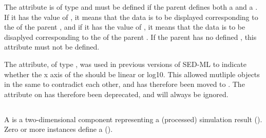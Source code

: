\begin{blockChanged}
The  attribute is of type  and must be defined if the parent \Plot defines both a  and a .  If it has the value of , it means that the data is to be displayed corresponding to the  of the parent \Plot, and if it has the value of , it means that the data is to be disaplyed corresponding to the  of the parent \Plot.  If the parent \Plot has no defined , this attribute must not be defined.

The  attribute, of type , was used in previous versions of SED-ML to indicate whether the x axis of the \Plot should be linear or log10.  This allowed mutliple \Curve objects in the same \Plot to contradict each other, and has therefore been moved to \Plot.  The  attribute on \Curve has therefore been deprecated, and will always be ignored.

\end{blockChanged}


\subsection{}
\label{class:curve}
A \Curve is a two-dimensional \Output component representing a (processed) simulation result (). Zero or more \Curve instances define a \PlotTwo (). 

